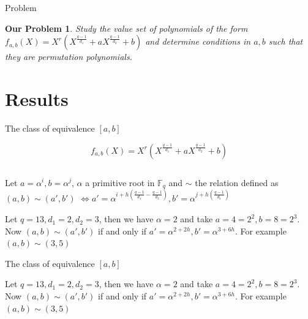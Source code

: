 \documentclass{beamer}
\newtheorem{ourproblem}{Our Problem}
\begin{document}
\begin{frame}{Problem}
  \begin{ourproblem}
    Study the value set of polynomials of the form $f_{a,b}(X) = X^r(X^{\frac{q-1}{d_1}} + aX^{\frac{q-1}{d_2}} +b)$ and determine conditions in $a,b$ such that they are permutation polynomials.
  \end{ourproblem}
\end{frame}

\section{Results} %
\label{sec:results}


\begin{frame}{The class of equivalence $[a,b]$}
  
  {\Large $$f_{a,b}(X) = X^r(X^{\frac{q-1}{d_1}} + aX^{\frac{q-1}{d_2}} +b)$$}

  $$$$

  Let $a = \alpha^i, b = \alpha^j$, $\alpha$ a primitive root in $\mathbb{F}_q$ and $\sim$ the relation defined as $(a,b) \sim (a', b')$ 
  $\Longleftrightarrow a' = \alpha^{i+h(\frac{q-1}{d_1} - \frac{q-1}{d_2})}, b' = \alpha^{j+h(\frac{q-1}{d_1})}$

  \begin{example}
    Let $q = 13, d_1 = 2, d_2 = 3$, then we have $\alpha = 2$ and take $a = 4 = 2^2, b = 8 = 2^3$. Now $(a,b) \sim (a',b')$ if and only if
    $a' = \alpha^{2+2h}, b' = \alpha^{3+6h}$. For example $(a,b) \sim (3,5)$
  \end{example}

\end{frame}

\begin{frame}{The class of equivalence $[a,b]$}

  \begin{example}
    Let $q = 13, d_1 = 2, d_2 = 3$, then we have $\alpha = 2$ and take $a = 4 = 2^2, b = 8 = 2^3$. Now $(a,b) \sim (a',b')$ if and only if
    $a' = \alpha^{2+2h}, b' = \alpha^{3+6h}$. For example $(a,b) \sim (3,5)$
  \end{example}

\end{frame}
\end{document}
